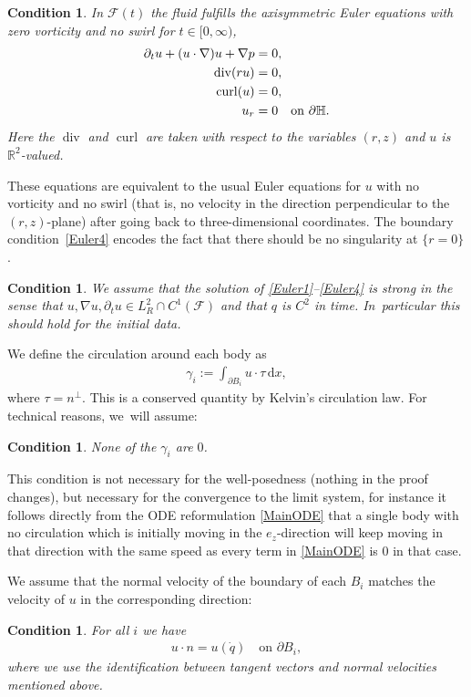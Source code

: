 \documentclass[JEP,XML,SOM,Unicode,published]{cedram}
\newtheorem{condition}[theorem]{Condition}
\theoremstyle{definition}
\renewcommand{\div}{\operatorname{div}}
\DeclareMathOperator{\curl}{curl}
\newcommand\R{\mathbb{R}}
\newcommand\eq{=}
\newcommand\dd{\,\mathrm{d}}
\newcommand\dx{\dd x}
\let\de\partial
\begin{document}
\begin{condition}
In $\mathcal{F}(t)$ the fluid fulfills the axisymmetric Euler equations with zero vorticity and no swirl for $t\in [0,\infty)$, \ie
\begin{align}
\de_t u+(u\cdot\nabla)u+\nabla p&\eq 0,\label{Euler1}\\
\div(ru)&\eq 0,\label{Euler2}\\
\curl(u)&\eq 0,\label{Euler3}\\
u_r&\eq 0 \quad\text{\normalfont{on} $\de \mathbb{H}$.}\label{Euler4}
\end{align}
Here the $\div$ and $\curl$ are taken with respect to the variables $(r,z)$ and $u$ is $\R^2$-valued.
\end{condition}

These equations are equivalent to the usual Euler equations for $u$ with no vorticity and no swirl (that is, no velocity in the direction perpendicular to the $(r,z)$-plane) after going back to three-dimensional coordinates. The boundary condition~\eqref{Euler4} encodes the fact that there should be no singularity at $\{r=0\}$.

\begin{condition}\label{strongsol}
We assume that the solution of \eqref{Euler1}--\eqref{Euler4} is strong in the sense that $u,\nabla u,\de_t u\in L_R^2\cap C^1(\mathcal{F})$ and that $q$ is $C^2$ in time. In~particular this should hold for the initial data.
\end{condition}

We define the circulation around each body as
\begin{align*}
\gamma_i:=\int_{\de B_i}u\cdot\tau\dx,
\end{align*}
where $\tau=n^\perp$. This is a conserved quantity by Kelvin's circulation law. For technical reasons, we~will assume:
\begin{condition}\label{cond:103}
None of the $\gamma_i$ are $0$.
\end{condition}

This condition is not necessary for the well-posedness (nothing in the proof changes),
but necessary for the convergence to the limit system, for instance it follows directly from the
ODE reformulation \eqref{MainODE} that a single body with no circulation which is initially moving in the $e_z$-direction will keep moving in that direction with the same speed as every term
in \eqref{MainODE} is 0 in that case.

We assume that the normal velocity of the boundary of each $B_i$ matches the velocity of $u$ in the corresponding direction:
\begin{condition} For all $i$ we have
\begin{align}
u\cdot n\eq u(\dot{q}) \quad\text{on $\de B_i$}\label{Euler5},
\end{align}
where we use the identification between tangent vectors and normal velocities mentioned above.
\end{condition}
\end{document}

